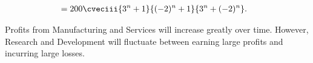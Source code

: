\begin{solution}
\begin{ppart}
\begin{align*}
            &= 200 \cveciii{3^n + 1}{(-2)^n + 1}{3^n + (-2)^n}.
        \end{align*}

        Profits from Manufacturing and Services will increase greatly over time. However, Research and Development will fluctuate between earning large profits and incurring large losses.
    \end{ppart}
\end{solution}